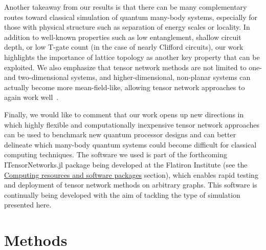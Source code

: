 \documentclass[%
 superscriptaddress,
 amsmath,amssymb,
 prx, nofootinbib,
 twocolumn
]{revtex4-2}
\begin{document}
\par Another takeaway from our results is that there can be many complementary routes toward classical simulation of quantum many-body systems, especially for those with physical structure such as separation of energy scales or locality. In addition to well-known properties such as low entanglement, shallow circuit depth, or low T-gate count (in the case of nearly Clifford circuits), our work highlights the importance of 
lattice topology %
as another key property that can be exploited. We also emphasize that tensor network methods are not limited to one- and two-dimensional systems, and higher-dimensional, non-planar systems can actually become more mean-field-like, allowing tensor network approaches to again work well~\cite{tindall2022quantum, searle2023exact}. 

Finally, we would like to comment that our work opens up new directions in which highly flexible and computationally inexpensive tensor network approaches can be used to benchmark new quantum processor designs and can better delineate which many-body quantum systems could become difficult for classical computing techniques. The software we used is part of the forthcoming ITensorNetworks.jl package \cite{ITensorNetworks} being developed at the Flatiron Institute  (see the \hyperref[Subsec:ComputingResources]{Computing resources and software packages} section), which enables rapid testing and deployment of tensor network methods on arbitrary graphs. This software is continually being developed with the aim of tackling the type of simulation presented here.  


\section*{Methods}
\label{Sec:Methods}
\end{document}
